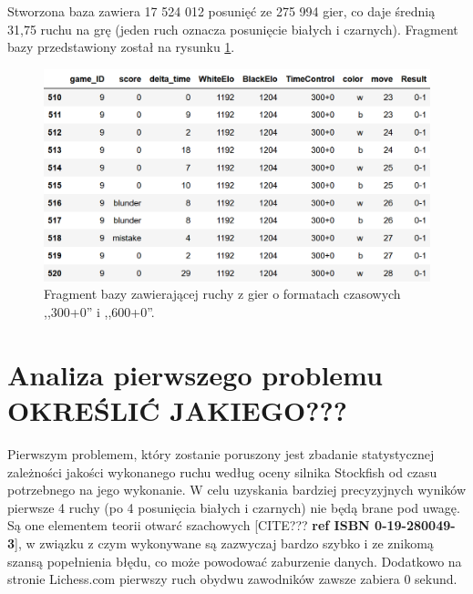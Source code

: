 \documentclass[inzynierska]{pwr_wmat_praca_dyplomowa}
\theoremstyle{plain}
\numberwithin{theorem}{chapter}
\theoremstyle{definition}
\numberwithin{theorem}{chapter}
\begin{document}
Stworzona baza zawiera 17 524 012 posunięć ze 275 994 gier, co daje średnią 31,75 ruchu na grę (jeden ruch oznacza posunięcie białych i czarnych). Fragment bazy przedstawiony został na rysunku \ref{rys:baza_ruchow}. 
\begin{figure}[H]
	\centering
	\includegraphics[width=\textwidth]{danee.png}
	\caption{Fragment bazy zawierającej ruchy z gier o formatach czasowych ,,300+0'' i ,,600+0''.}
	\label{rys:baza_ruchow}
\end{figure}




\section{Analiza pierwszego problemu OKREŚLIĆ JAKIEGO???}
Pierwszym problemem, który zostanie poruszony jest zbadanie statystycznej zależności jakości wykonanego ruchu według oceny silnika Stockfish od czasu potrzebnego na jego wykonanie. W celu uzyskania bardziej precyzyjnych wyników pierwsze 4 ruchy (po 4 posunięcia białych i czarnych) nie będą brane pod uwagę. Są one elementem teorii otwarć szachowych [CITE??? \textbf{ref ISBN 0-19-280049-3}], w związku z czym wykonywane są zazwyczaj bardzo szybko i ze znikomą szansą popełnienia błędu, co może powodować zaburzenie danych. Dodatkowo na stronie Lichess.com pierwszy ruch obydwu zawodników zawsze zabiera 0 sekund.
\end{document}
